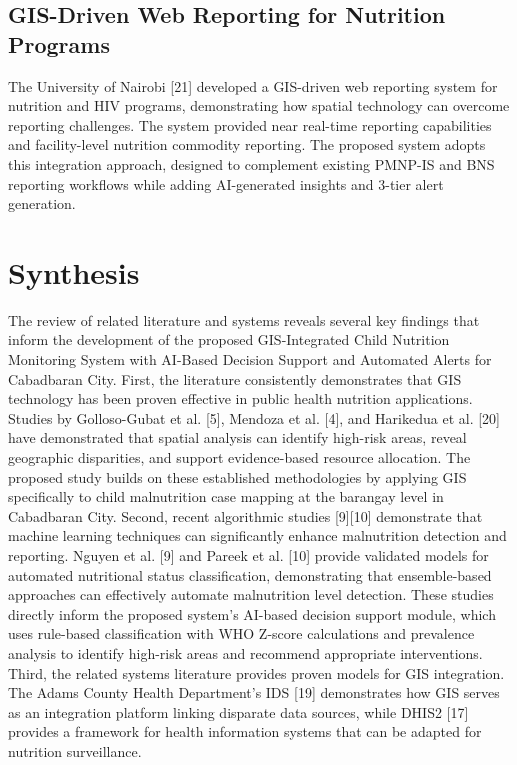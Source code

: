 \documentclass[12pt, a4paper]{report}
\begin{document}
\subsection{GIS-Driven Web Reporting for Nutrition Programs}
The University of Nairobi [21] developed a GIS-driven web reporting system for nutrition and HIV programs, demonstrating how spatial technology can overcome reporting challenges. The system provided near real-time reporting capabilities and facility-level nutrition commodity reporting. The proposed system adopts this integration approach, designed to complement existing PMNP-IS and BNS reporting workflows while adding AI-generated insights and 3-tier alert generation.

\section{Synthesis}
\label{sec:synthesis}
The review of related literature and systems reveals several key findings that inform the development of the proposed GIS-Integrated Child Nutrition Monitoring System with AI-Based Decision Support and Automated Alerts for Cabadbaran City.
First, the literature consistently demonstrates that GIS technology has been proven effective in public health nutrition applications. Studies by Golloso-Gubat et al. [5], Mendoza et al. [4], and Harikedua et al. [20] have demonstrated that spatial analysis can identify high-risk areas, reveal geographic disparities, and support evidence-based resource allocation. The proposed study builds on these established methodologies by applying GIS specifically to child malnutrition case mapping at the barangay level in Cabadbaran City.
Second, recent algorithmic studies [9][10] demonstrate that machine learning techniques can significantly enhance malnutrition detection and reporting. Nguyen et al. [9] and Pareek et al. [10] provide validated models for automated nutritional status classification, demonstrating that ensemble-based approaches can effectively automate malnutrition level detection. These studies directly inform the proposed system's AI-based decision support module, which uses rule-based classification with WHO Z-score calculations and prevalence analysis to identify high-risk areas and recommend appropriate interventions.
Third, the related systems literature provides proven models for GIS integration. The Adams County Health Department's IDS [19] demonstrates how GIS serves as an integration platform linking disparate data sources, while DHIS2 [17] provides a framework for health information systems that can be adapted for nutrition surveillance.
\end{document}
